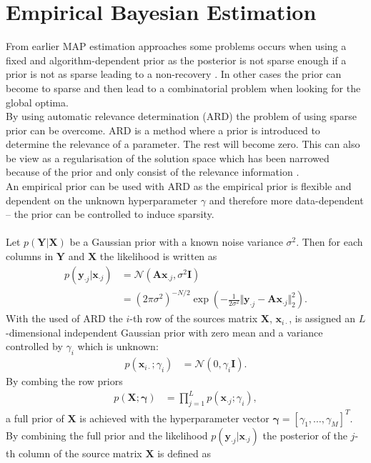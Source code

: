 \section{Empirical Bayesian Estimation}
From earlier MAP estimation approaches some problems occurs when using a fixed and algorithm-dependent prior as the posterior is not sparse enough if a prior is not as sparse leading to a non-recovery . In other cases the prior can become to sparse and then lead to a combinatorial problem when looking for the global optima.
\\
By using automatic relevance determination (ARD) the problem of using sparse prior can be overcome. ARD is a method where a prior is introduced to determine the relevance of a parameter. The rest will become zero. This can also be view as a regularisation of the solution space which has been narrowed because of the prior and only consist of the relevance information \cite{??}.
\\
An empirical prior can be used with ARD as the empirical prior is flexible and dependent on the unknown hyperparameter $\gamma$ and therefore more data-dependent -- the prior can be controlled to induce sparsity.
\\ \\
Let $p(\mathbf{Y} \vert \mathbf{X})$ be a Gaussian prior with a known noise variance $\sigma^2$. Then for each columns in $\mathbf{Y}$ and $\mathbf{X}$ the likelihood is written as
\begin{align*}
p(\mathbf{y}_{\cdot j} \vert \mathbf{x}_{\cdot j}) &= \mathcal{N}(\mathbf{Ax}_{.j}, \sigma^2 \mathbf{I}) \\
&= (2 \pi \sigma^2)^{-N/2} \exp \left( - \frac{1}{2 \sigma^2} \Vert \mathbf{y}_{\cdot j} - \mathbf{A} \mathbf{x}_{\cdot j} \Vert_2^2 \right).
\end{align*}
With the used of ARD the $i$-th row of the sources matrix $\mathbf{X}$, $\mathbf{x}_{i \cdot}$, is assigned an $L$-dimensional independent Gaussian prior with zero mean and a variance controlled by $\gamma_i$ which is unknown:
\begin{align*}
p (\mathbf{x}_{i \cdot} ; \gamma_i) &= \mathcal{N}(0, \gamma_i \mathbf{I}).
\end{align*}
By combing the row priors 
\begin{align*}
p (\mathbf{X} ; \boldsymbol{\gamma}) &= \prod_{j=1}^L p (\mathbf{x}_{ \cdot j} ; \gamma_i),
\end{align*}
a full prior of $\mathbf{X}$ is achieved with the hyperparameter vector $\boldsymbol{\gamma} = [\gamma_1, \dots, \gamma_M]^T$. By combining the full prior and the likelihood $p(\mathbf{y}_{\cdot j} \vert \mathbf{x}_{\cdot j})$ the posterior of the $j$-th column of the source matrix $\mathbf{X}$ is defined as
